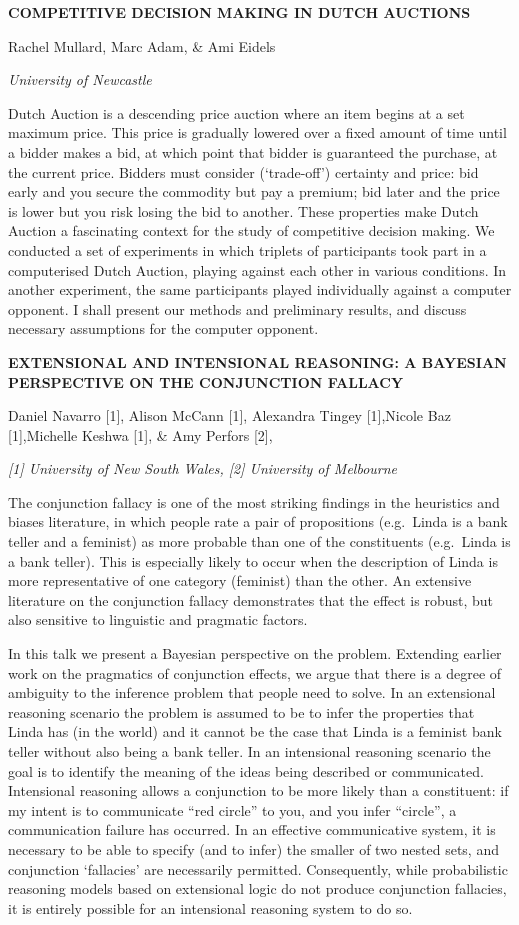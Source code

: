 \documentclass[]{article}
\begin{document}
\textbf{COMPETITIVE DECISION MAKING IN DUTCH AUCTIONS}

Rachel Mullard, Marc Adam, \& Ami Eidels

\emph{University of Newcastle}

Dutch Auction is a descending price auction where an item begins at a
set maximum price. This price is gradually lowered over a fixed amount
of time until a bidder makes a bid, at which point that bidder is
guaranteed the purchase, at the current price. Bidders must consider
(`trade-off') certainty and price: bid early and you secure the
commodity but pay a premium; bid later and the price is lower but you
risk losing the bid to another. These properties make Dutch Auction a
fascinating context for the study of competitive decision making. We
conducted a set of experiments in which triplets of participants took
part in a computerised Dutch Auction, playing against each other in
various conditions. In another experiment, the same participants played
individually against a computer opponent. I shall present our methods
and preliminary results, and discuss necessary assumptions for the
computer opponent.

\textbf{EXTENSIONAL AND INTENSIONAL REASONING: A BAYESIAN PERSPECTIVE ON
THE CONJUNCTION FALLACY}

Daniel Navarro {[}1{]}, Alison McCann {[}1{]}, Alexandra Tingey
{[}1{]},Nicole Baz {[}1{]},Michelle Keshwa {[}1{]}, \& Amy Perfors
{[}2{]},

\emph{{[}1{]} University of New South Wales, {[}2{]} University of
Melbourne}

The conjunction fallacy is one of the most striking findings in the
heuristics and biases literature, in which people rate a pair of
propositions (e.g.~Linda is a bank teller and a feminist) as more
probable than one of the constituents (e.g.~Linda is a bank teller).
This is especially likely to occur when the description of Linda is more
representative of one category (feminist) than the other. An extensive
literature on the conjunction fallacy demonstrates that the effect is
robust, but also sensitive to linguistic and pragmatic factors.

In this talk we present a Bayesian perspective on the problem. Extending
earlier work on the pragmatics of conjunction effects, we argue that
there is a degree of ambiguity to the inference problem that people need
to solve. In an extensional reasoning scenario the problem is assumed to
be to infer the properties that Linda has (in the world) and it cannot
be the case that Linda is a feminist bank teller without also being a
bank teller. In an intensional reasoning scenario the goal is to
identify the meaning of the ideas being described or communicated.
Intensional reasoning allows a conjunction to be more likely than a
constituent: if my intent is to communicate ``red circle'' to you, and
you infer ``circle'', a communication failure has occurred. In an
effective communicative system, it is necessary to be able to specify
(and to infer) the smaller of two nested sets, and conjunction
`fallacies' are necessarily permitted. Consequently, while probabilistic
reasoning models based on extensional logic do not produce conjunction
fallacies, it is entirely possible for an intensional reasoning system
to do so.
\end{document}
